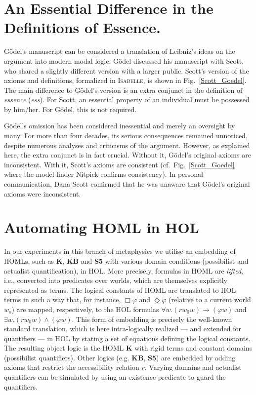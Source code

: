 \documentclass{llncs}
\newcommand{\imp}{{\rightarrow}}
\begin{document}
\section{An Essential Difference in the Definitions of Essence.}
\label{sec:history}
G\"odel's manuscript can be considered a translation of Leibniz's
ideas on the argument into modern modal logic. G\"odel
discussed his manuscript with Scott, who shared a slightly different
version with a larger public. Scott's version of the axioms and
definitions, formalized in \textsc{Isabelle}, is shown in
Fig.~\ref{Scott_Goedel}. 
The main difference to G\"odel's version is an
extra conjunct in the definition of \emph{essence} (\emph{ess}). For Scott,
an essential property of an individual must be possessed by
him/her. For G\"odel, this is not required. 


G\"odel's omission has been
considered inessential and merely an oversight by many. 
For more than four decades, its serious consequences remained unnoticed, 
despite numerous analyses and criticisms of the
argument.
However, as explained here, the extra conjunct is in
fact crucial. Without it, G\"odel's original axioms are
inconsistent. With it, Scott's axioms are consistent (cf.~Fig.~\ref{Scott_Goedel}
where the model finder Nitpick \cite{Nitpick} confirms consistency). In
personal communication, Dana Scott confirmed that he was unaware
that G\"odel's original axioms were inconsistent.









\section{Automating HOML in HOL}\label{sec:homlinhol}



In our experiments in this branch of metaphysics we
utilise an embedding of HOMLs, such as \textbf{K}, \textbf{KB} and
\textbf{S5} with various domain conditions (possibilist and actualist
quantification), in HOL. More precisely, formulas in HOML are \emph{lifted}, i.e., converted
into predicates over worlds, which are themselves explicitly
represented as terms. The logical constants of HOML are translated to
HOL terms in such a way that, for instance,
$\Box \varphi$ and $\Diamond \varphi$ (relative to a current world
$w_o$) are mapped, respectively, to the HOL formulas
$\forall w. (r w_0 w) \imp (\varphi w)$ and
$\exists w. (r w_0 w) \wedge (\varphi w)$. This form of embedding is
precisely the well-known standard translation,
which is here intra-logically realized --- and extended for
quantifiers --- in HOL by stating a set of equations defining the
logical constants. The resulting object logic is
the HOML \textbf{K} with rigid terms and constant domains (possibilist
quantifiers). Other logics (e.g. \textbf{KB}, \textbf{S5}) are
embedded by adding axioms that restrict the accessibility relation
$r$. Varying domains and actualist quantifiers can be simulated by
using an existence predicate to guard the quantifiers. 
\end{document}
